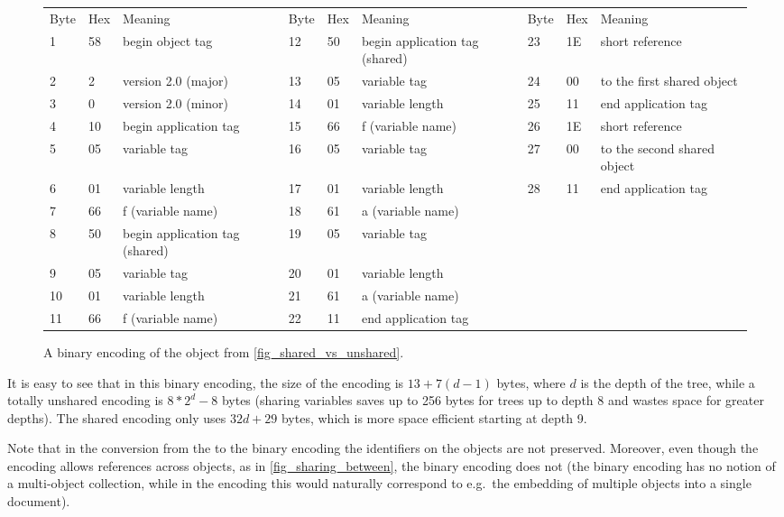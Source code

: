     
\begin{figure}\centering\footnotesize
  \begin{tabular}{lllllllll}
    Byte &Hex &Meaning &
    Byte &Hex &Meaning &
    Byte &Hex &Meaning \\
    1 &58 &begin object tag &
    12 &50 &begin application tag (shared) &
    23 &1E &short reference \\
    2 &2 & version 2.0 (major) &
    13 &05 &variable tag &
    24 &00 &to the first shared object \\
    3 &0 & version 2.0 (minor) &
    14 &01 &variable length &
    25 &11 &end application tag \\
    4 &10 &begin application tag &
    15 &66 &f  (variable name) &
    26 &1E &short reference \\
    5 &05 &variable tag &
    16 &05 &variable tag &
    27 &00 &to the second shared object \\
    6 &01 &variable length &
    17 &01 &variable length &
    28 &11 &end application tag \\
    7 &66 &f  (variable name) &
    18 &61 &a  (variable name) \\
    8 &50 &begin application tag (shared) &
    19 &05 &variable tag \\
    9 &05 &variable tag &
    20 &01 &variable length \\
    10 &01 &variable length &
    21 &61 &a  (variable name)\\
    11 &66 &f  (variable name) & 
    22 &11 &end application tag
  \end{tabular}
  \caption{A binary encoding of the \OM object from \ref{fig_shared_vs_unshared}.}\label{fig_bin-enc2}
\end{figure}    

It is easy to see that in this binary encoding, the size of the encoding is $13+7(d-1)$
bytes, where $d$ is the depth of the tree, while a totally unshared encoding is
$8\ast2^d-8$ bytes (sharing variables saves up to 256 bytes for trees up to depth 8 and
wastes space for greater depths). The shared \XML encoding only uses $32d+29$ bytes, which
is more space efficient starting at depth 9.
    
Note that in the conversion from the \XML to the binary encoding the identifiers on the
objects are not preserved. Moreover, even though the \XML encoding allows references
across objects, as in \ref{fig_sharing_between}, the binary encoding does not (the binary
encoding has no notion of a multi-object collection, while in the \XML encoding this would
naturally correspond to e.g.~the embedding of multiple \OM objects into a single \XML
document).
    
